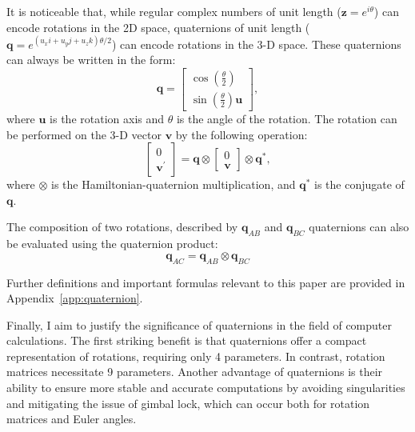 It is noticeable that, while regular complex numbers of unit length ($\mathbf{z}=e^{i\theta}$) can encode rotations in the 2D space, quaternions of unit length ($\mathbf{q}=e^{(u_{x}i+u_{y}j+u_{z}k)\theta/2}$) can encode rotations in the 3-D space. These quaternions can always be written in the form:
\begin{equation}
    \mathbf{q}=\begin{bmatrix}
        \cos\left(\frac{\theta}{2}\right) \\
        \sin\left(\frac{\theta}{2}\right)\mathbf{u}
    \end{bmatrix},
\end{equation}
where $\mathbf{u}$ is the rotation axis and $\theta$ is the angle of the rotation. The rotation can be performed on the 3-D vector $\mathbf{v}$ by the following operation:
\begin{equation}
    \begin{bmatrix}
        0 \\ 
        \mathbf{v}^{'}
    \end{bmatrix}=\mathbf{q}\otimes\begin{bmatrix}
        0 \\ 
        \mathbf{v}
    \end{bmatrix}\otimes\mathbf{q}^*,
    \label{eq:quat-rot}
\end{equation}
where $\otimes$ is the Hamiltonian-quaternion multiplication, and $\mathbf{q}^*$ is the conjugate of $\mathbf{q}$. 

The composition of two rotations, described by $\mathbf{q}_{AB}$ and $\mathbf{q}_{BC}$ quaternions can also be evaluated using the quaternion product:
\begin{equation}
    \mathbf{q}_{AC}=\mathbf{q}_{AB}\otimes\mathbf{q}_{BC}
\end{equation}

Further definitions and important formulas relevant to this paper are provided in Appendix~\ref{app:quaternion}.

Finally, I aim to justify the significance of quaternions in the field of computer calculations. The first striking benefit is that quaternions offer a compact representation of rotations, requiring only 4 parameters. In contrast, rotation matrices necessitate  9 parameters. Another advantage of quaternions is their ability to ensure more stable and accurate computations by avoiding singularities and mitigating the issue of gimbal lock, which can occur both for rotation matrices and Euler angles.